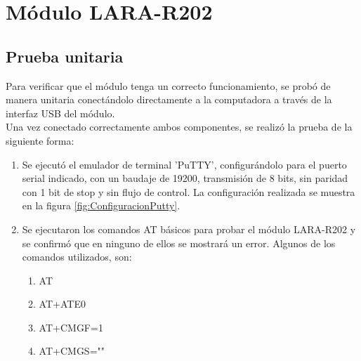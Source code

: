 \section{Módulo LARA-R202}
\subsection{Prueba unitaria}
Para verificar que el módulo tenga un correcto funcionamiento, se probó de manera unitaria conectándolo directamente a la computadora a través de la interfaz USB del módulo.\\ %
%
	
Una vez conectado correctamente ambos componentes, se realizó la prueba de la siguiente forma:
\begin{enumerate}
	\item Se ejecutó el emulador de terminal ’PuTTY’, configurándolo para el puerto serial
	indicado, con un baudaje de 19200, transmisión de 8 bits, sin paridad con 1 bit de
	stop y sin flujo de control. La configuración realizada se muestra en la figura \ref{fig:ConfiguracionPutty}.
	\item Se ejecutaron los comandos AT básicos para probar el módulo LARA-R202 y se confirmó que en ninguno de ellos se mostrará un error. Algunos de los comandos utilizados, son:

		\begin{enumerate}
			\item AT
			\item AT+ATE0
			\item AT+CMGF=1
			\item AT+CMGS=""
		\end{enumerate}	
\end{enumerate}
 
